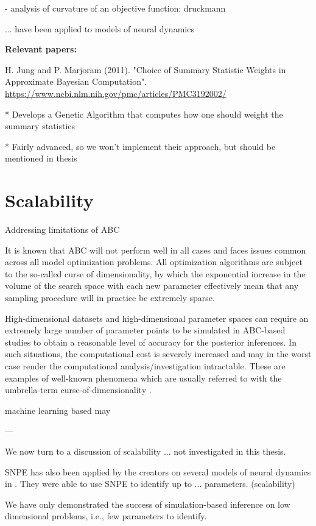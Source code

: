 - analysis of curvature of an objective function: druckmann

... have been applied to models of neural dynamics

\textbf{Relevant papers:}

H. Jung and P. Marjoram (2011). "Choice of Summary Statistic Weights in Approximate Bayesian Computation". \url{https://www.ncbi.nlm.nih.gov/pmc/articles/PMC3192002/}

* Develops a Genetic Algorithm that computes how one should weight the summary statistics 

* Fairly advanced, so we won't implement their approach, but should be mentioned in thesis

\section{Scalability}

Addressing limitations of ABC

It is known that ABC will not perform well in all cases and faces issues common across all model optimization problems. All optimization algorithms are subject to the so-called curse of dimensionality, by which the exponential increase in the volume of the search space with each new parameter effectively mean that any sampling procedure will in practice be extremely sparse. 

High-dimensional datasets and high-dimensional parameter spaces can require an extremely large number of parameter points to be simulated in ABC-based studies to obtain a reasonable level of accuracy for the posterior inferences. In such situations, the computational cost is severely increased and may in the worst case render the computational analysis/investigation intractable. These are examples of well-known phenomena which are usually referred to with the umbrella-term curse-of-dimensionality \cite{ABCprimer}. 

machine learning based may 

---

We now turn to a discussion of scalability ... not investigated in this thesis. 

SNPE has also been applied by the creators on several models of neural dynamics in \cite{SNPE_applied}. They were able to use SNPE to identify up to ... parameters. (scalability)


We have only demonstrated the success of simulation-based inference on low dimensional problems, i.e., few parameters to identify. 

